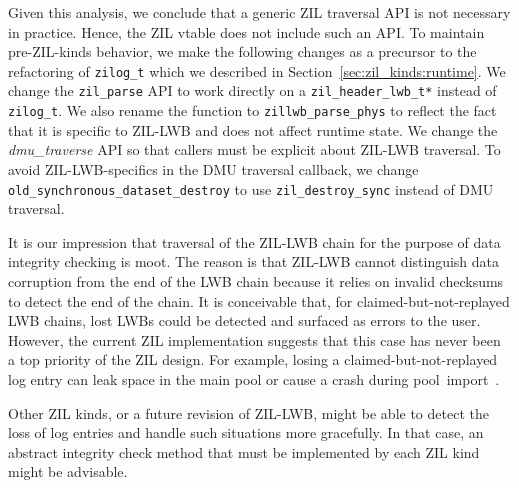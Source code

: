 \documentclass[12pt,a4paper,twoside]{book}
\begin{document}
{Given this analysis, we conclude that a generic ZIL traversal API is not necessary in practice.
Hence, the ZIL vtable does not include such an API.
To maintain pre-ZIL-kinds behavior, we make the following changes as a precursor to the refactoring of \lstinline{zilog_t} which we described in Section~\ref{sec:zil_kinds:runtime}.
We change the \lstinline{zil_parse} API to work directly on a \lstinline{zil_header_lwb_t*} instead of \lstinline{zilog_t}.
We also rename the function to \lstinline{zillwb_parse_phys} to reflect the fact that it is specific to ZIL-LWB and does not affect runtime state.
We change the \textit{dmu\_traverse} API so that callers must be explicit about ZIL-LWB traversal.
To avoid ZIL-LWB-specifics in the DMU traversal callback, we change \lstinline{old_synchronous_dataset_destroy} to use \lstinline{zil_destroy_sync} instead of DMU traversal.

It is our impression that traversal of the ZIL-LWB chain for the purpose of data integrity checking is moot.
The reason is that ZIL-LWB cannot distinguish data corruption from the end of the LWB chain because it relies on invalid checksums to detect the end of the chain.
It is conceivable that, for claimed-but-not-replayed LWB chains, lost LWBs could be detected and surfaced as errors to the user.
However, the current ZIL implementation suggests that this case has never been a top priority of the ZIL design.
For example, losing a claimed-but-not-replayed log entry can leak space in the main pool or cause a crash during \mbox{pool import \cite{OpenZFSGithubIssueHandlingOfLostClaimedNotReplayedLogRecords,OpenZFSGithubIssueFailingDebugAssertionWhenLosingClaimedNotReplayedLWBs}}.

Other ZIL kinds, or a future revision of ZIL-LWB, might be able to detect the loss of log entries and handle such situations more gracefully.
In that case, an abstract integrity check method that must be implemented by each ZIL kind might be advisable.

}
\end{document}
